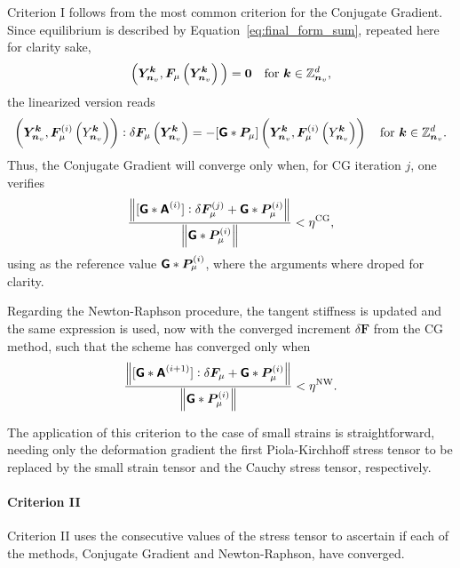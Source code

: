 Criterion I follows from the most common criterion for the Conjugate Gradient.
Since equilibrium is described by Equation~\eqref{eq:final_form_sum}, repeated here for clarity sake,
\begin{equation}
[\boldsf G * \bm P_\mu]\Big(\bm Y_{\bm n_v}^{\bm k}, \bm F_\mu\left(\bm Y_{\bm n_v}^{\bm  k}\right)\Big)=\bm 0\quad \text{for \( \bm k \in \mathbb Z^d_{\bm n_v}\)},
\end{equation}
the linearized version reads
\begin{equation}
[\boldsf{G}* \boldsf A^{(i)}] \left(\bm Y_{\bm n_v}^{\bm  k}, \bm F_\mu^{(i)}\left(Y_{\bm n_v}^{\bm  k}\right)\right):\delta {\bm{F}_\mu}\left(\bm Y_{\bm n_v}^{\bm  k}\right)=-[\boldsf{G}* \bm{P}_\mu]\left(\bm Y_{\bm n_v}^{\bm  k}, \bm F_\mu^{(i)}\left(Y_{\bm n_v}^{\bm  k}\right)\right)\quad\text{for \(\bm k\in \mathbb Z^d_{\bm n_v}\)}.
\end{equation}
Thus, the Conjugate Gradient will converge only when, for CG iteration \(j\), one verifies
\begin{equation}
\frac{\displaystyle{\left\|[\boldsymbol{\mathsf{G}}* \boldsymbol{\mathsf{A}}^{(i)}]: \delta \bm F_\mu^{(j)}+\boldsymbol{\mathsf{G}}* \bm P_\mu^{(i)}\right\|}}{\displaystyle{\left\|\boldsymbol{\mathsf{G}}* \bm P_\mu^{(i)}\right\|}}<\eta^{\mathrm{CG}},
\end{equation}
using as the reference value \(\boldsymbol{\mathsf{G}}*\bm P_\mu^{(i)}\), where the arguments where droped for clarity.

Regarding the Newton-Raphson procedure, the tangent stiffness is updated and the same expression is used, now with the converged increment \(\delta \bm F\) from the CG method, such that the scheme has converged only when
\begin{equation}
\frac{\displaystyle{\left\|[\boldsymbol{\mathsf{G}}* \boldsymbol{\mathsf{A}}^{(i+1)}]: \delta \bm F_\mu+\boldsymbol{\mathsf{G}}* \bm P_\mu^{(i)}\right\|}}{\displaystyle{\left\|\boldsymbol{\mathsf{G}}* \bm P_\mu^{(i)}\right\|}}<\eta^{\mathrm{NW}}.
\end{equation}

The application of this criterion to the case of small strains is straightforward, needing only the deformation gradient the first Piola-Kirchhoff stress tensor to be replaced by the small strain tensor and the Cauchy stress tensor, respectively.

\paragraph{Criterion II}

Criterion II uses the consecutive values of the stress tensor to ascertain if each of the methods, Conjugate Gradient and Newton-Raphson, have converged.

